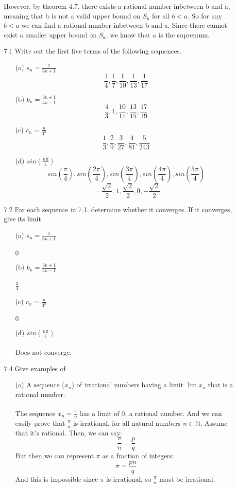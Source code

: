 \begin{itemize}
    However, by theorem 4.7, there exists a rational number inbetween b and a, meaning that b is not a valid upper bound on $S_a$ for all $b < a$. So for any $b < a$ we can find a rational number inbetween b and a. Since there cannot exist a smaller upper bound on $S_a$, we know that $a$ is the supremum.
  \item [7.1]
    Write out the first five terms of the following sequences.
    \begin{itemize}
      \item [(a)] $s_n = \frac{1}{3n+1}$\\
        $$\frac{1}{4}, \frac{1}{7}, \frac{1}{10}, \frac{1}{13}, \frac{1}{17}$$
      \item [(b)] $b_n = \frac{3n+1}{4n-1}$
        $$\frac{4}{3}, 1, \frac{10}{11}, \frac{13}{15}, \frac{17}{19}$$
      \item [(c)] $c_n = \frac{n}{3^n}$
        $$\frac{1}{3}, \frac{2}{9}, \frac{3}{27}, \frac{4}{81}, \frac{5}{243}$$
      \item [(d)] $sin(\frac{n\pi}{4})$
        $$sin(\frac{\pi}{4}), sin(\frac{2\pi}{4}), sin(\frac{3\pi}{4}), sin(\frac{4\pi}{4}), sin(\frac{5\pi}{4})$$
        $$=\frac{\sqrt{2}}{2}, 1, \frac{\sqrt{2}}{2}, 0, -\frac{\sqrt{2}}{2}$$
    \end{itemize}
  \item [7.2]
    For each sequence in 7.1, determine whether it converges. If it converges, give its limit.
    \begin{itemize}
      \item [(a)] $s_n = \frac{1}{3n+1}$\\\\
        $0$
      \item [(b)] $b_n = \frac{3n+1}{4n-1}$\\\\
        $\frac{3}{4}$
      \item [(c)] $c_n = \frac{n}{3^n}$\\\\
        $0$
      \item [(d)] $sin(\frac{n\pi}{4})$\\\\
        Does not converge.
    \end{itemize}
  \item [7.4]
    Give examples of
    \begin{itemize}
      \item [(a)] A sequence ($x_n$) of irrational numbers having a limit $\lim x_n$ that is a rational number.\\\\
        The sequence $x_n = \frac{\pi}{n}$ has a limit of $0$, a rational number. And we can easily prove that $\frac{\pi}{n}$ is irrational, for all natural numbers $n \in \mathds{N}$. Assume that it's rational. Then, we can say:
        $$\frac{\pi}{n} = \frac{p}{q}$$
        But then we can represent $\pi$ as a fraction of integers:
        $$\pi = \frac{pn}{q}$$
        And this is impossible since $\pi$ is irrational, so $\frac{\pi}{n}$ must be irrational.
        

\end{itemize}
\end{itemize}
